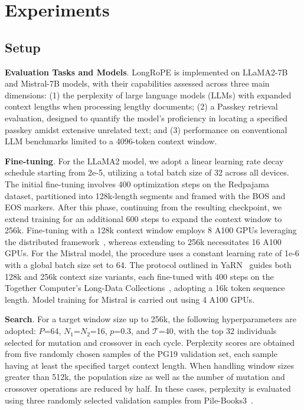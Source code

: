  \section{Experiments}

\label{sec:exp}
\subsection{Setup}
\textbf{Evaluation Tasks and Models}. LongRoPE is implemented on LLaMA2-7B and Mistral-7B models, with their capabilities assessed across three main dimensions: (1) the perplexity of large language models (LLMs) with expanded context lengths when processing lengthy documents; (2) a Passkey retrieval evaluation, designed to quantify the model's proficiency in locating a specified passkey amidst extensive unrelated text; and (3) performance on conventional LLM benchmarks limited to a 4096-token context window.

\textbf{Fine-tuning}. For the LLaMA2 model, we adopt a linear learning rate decay schedule starting from 2e-5, utilizing a total batch size of 32 across all devices. The initial fine-tuning involves 400 optimization steps on the Redpajama~\cite{redpajama} dataset, partitioned into 128k-length segments and framed with the BOS and EOS markers. After this phase, continuing from the resulting checkpoint, we extend training for an additional 600 steps to expand the context window to 256k. Fine-tuning with a 128k context window employs 8 A100 GPUs leveraging the distributed framework~\cite{cube}, whereas extending to 256k necessitates 16 A100 GPUs. For the Mistral model, the procedure uses a constant learning rate of 1e-6 with a global batch size set to 64. The protocol outlined in YaRN~\cite{yarn} guides both 128k and 256k context size variants, each fine-tuned with 400 steps on the Together Computer's Long-Data Collections~\cite{mistraldata}, adopting a 16k token sequence length. Model training for Mistral is carried out using 4 A100 GPUs.

\textbf{Search}. For a target window size up to 256k, the following hyperparameters are adopted: $P$=64, $N_1$=$N_2$=16, $p$=0.3, and $\mathcal{T}$=40, with the top 32 individuals selected for mutation and crossover in each cycle. Perplexity scores are obtained from five randomly chosen samples of the PG19 validation set, each sample having at least the specified target context length. When handling window sizes greater than 512k, the population size as well as the number of mutation and crossover operations are reduced by half. In these cases, perplexity is evaluated using three randomly selected validation samples from Pile-Books3~\cite{pile}.

